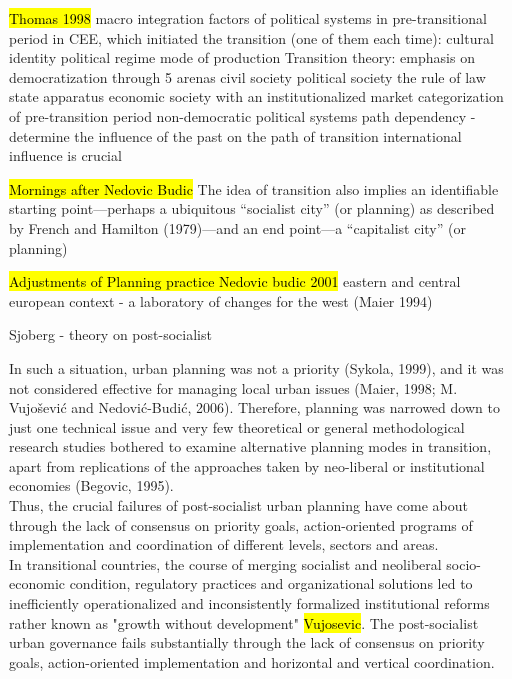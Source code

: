 \documentclass[11pt]{report}
\begin{document}
\hl{Thomas 1998}
macro integration factors of political systems in pre-transitional period in CEE, which initiated the transition (one of them each time):
    cultural identity
    political regime
    mode of production
Transition theory:
    emphasis on democratization through 5 arenas
        civil society
        political society
        the rule of law
        state apparatus
        economic society with an institutionalized market
    categorization of pre-transition period
        non-democratic political systems
    path dependency - determine the influence of the past on the path of transition
    international influence is crucial

\hl{Mornings after Nedovic Budic}
The idea of transition also implies an identiﬁable starting point—perhaps a ubiquitous “socialist city” (or planning) as described by French and Hamilton (1979)—and an end point—a “capitalist city” (or planning)

\hl{Adjustments of Planning practice Nedovic budic 2001}
eastern and central european context - a laboratory of changes for the west (Maier 1994)

Sjoberg - theory on post-socialist

In such a situation, urban planning was not a priority (Sykola, 1999), and it was not considered effective for managing local urban issues (Maier, 1998; M. Vujošević and Nedović-Budić, 2006). Therefore, planning was narrowed down to just one technical issue and very few theoretical or general methodological research studies bothered to examine alternative planning modes in transition, apart from replications of the approaches taken by neo-liberal or institutional economies (Begovic, 1995).
\\
Thus, the crucial failures of post-socialist urban planning have come about through the lack of consensus on priority goals, action-oriented programs of implementation and coordination of different levels, sectors and areas. 
\\
In transitional countries, the course of merging socialist and neoliberal socio-economic condition, regulatory practices and organizational solutions led to inefficiently operationalized and inconsistently formalized institutional reforms rather known as "growth without development" \hl{Vujosevic}.
The post-socialist urban governance fails substantially through the lack of consensus on priority goals, action-oriented implementation and horizontal and vertical coordination.
\\
\end{document}
